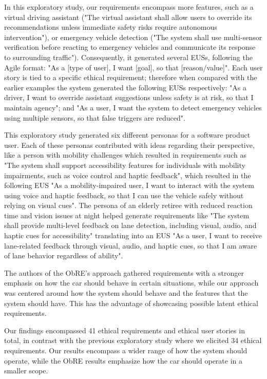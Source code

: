 In this exploratory study, our requirements encompass more features, such as a virtual driving assistant ("The virtual assistant shall allow users to override its recommendations unless immediate safety risks require autonomous intervention"), or emergency vehicle detection ("The system shall use multi-sensor verification before reacting to emergency vehicles and communicate its response to surrounding traffic").
Consequently, it generated several EUSs, following the Agile format: "As a [type of user], I want [goal], so that [reason/value]". Each user story is tied to a specific ethical requirement; therefore when compared with the earlier examples the system generated the following EUSs respectively: "As a driver, I want to override assistant suggestions unless safety is at risk, so that I maintain agency"; and "As a user, I want the system to detect emergency vehicles using multiple sensors, so that false triggers are reduced".


This exploratory study generated six different personas for a software product user. Each of these personas contributed with ideas regarding their perspective, like a person with mobility challenges which resulted in requirements such as "The system shall support accessibility features for individuals with mobility impairments, such as voice control and haptic feedback", which resulted in the following EUS "As a mobility-impaired user, I want to interact with the system using voice and haptic feedback, so that I can use the vehicle safely without relying on visual cues". The persona of %
an elderly retiree with reduced reaction time and vision issues at night %
helped generate requirements like "The system shall provide multi-level feedback on lane detection, including visual, audio, and haptic cues for accessibility" translating into an EUS "As a user, I want to receive lane-related feedback through visual, audio, and haptic cues, so that I am aware of lane behavior regardless of ability".


The authors of the ObRE's approach gathered requirements with a stronger emphasis on how the car should behave in certain situations, while our approach was centered around how the system should behave and the features that the system should have. This has the advantage of showcasing possible latent ethical requirements.


Our findings encompassed 41 ethical requirements and ethical user stories in total, in contrast with the previous exploratory study where we elicited 34 ethical requirements.
Our results encompass a wider range of how the system should operate, while the ObRE results emphasize how the car should operate in a smaller scope.

